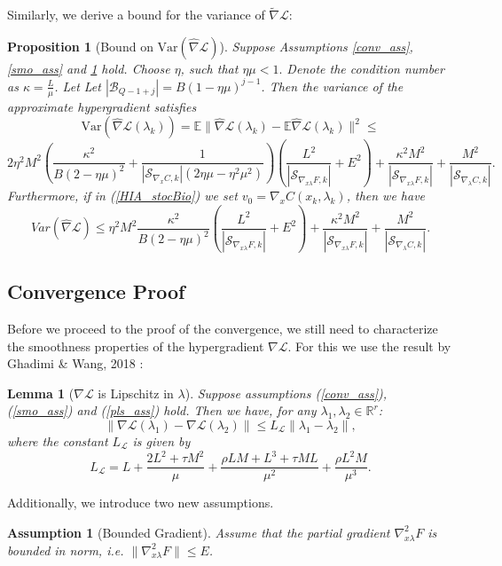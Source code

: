 \documentclass[11pt, twoside]{report}
\newtheorem{proposition}[theorem]{Proposition}
\newtheorem{assumption}[theorem]{Assumption}
\newtheorem{lemma}[theorem]{Lemma}
\begin{document}
Similarly, we derive a bound for the variance of $\widetilde{\nabla} \mathcal{L}$:
\begin{proposition}[Bound on $\mathrm{Var}(\widehat{\nabla} \mathcal{L})$] \label{bound_nabla_hat}
Suppose Assumptions \ref{conv_ass}, \ref{smo_ass} and \ref{nablaFxl_bnd} hold. Choose $\eta$, such that $\eta \mu < 1.$ Denote the condition number as $\kappa = \frac{L}{\mu}$. Let Let $|\mathcal{B}_{Q-1+j}| = B(1-\eta\mu)^{j-1}$. Then the variance of the approximate hypergradient satisfies
\[\mathrm{Var}(\widehat{\nabla} \mathcal{L}(\lambda_k)) = \mathbb{E}\|\widehat{\nabla} \mathcal{L}(\lambda_k) - \mathbb{E}\widehat{\nabla} \mathcal{L}(\lambda_k)\|^2 \leq\]
\[2\eta^2M^2\left(\frac{\kappa^2}{B (2 - \eta \mu)^2} + \frac{1}{|\mathcal{S}_{\nabla_{x} C,k}|(2\eta \mu - \eta^2 \mu^2)} \right)\left(\frac{L^2}{|\mathcal{S}_{\nabla_{x\lambda} F,k}|} + E^2\right)  +  \frac{\kappa^2M^2}{|\mathcal{S}_{\nabla_{x\lambda} F,k}|}+ \frac{M^2}{|\mathcal{S}_{\nabla_{\lambda} C,k}|}.\]
Furthermore, if in (\ref{HIA_stocBio}) we set $v_0 = \nabla_x C(x_k,\lambda_k)$, then we have
    \[Var(\widehat{\nabla} \mathcal{L}) \leq \eta^2M^2\frac{\kappa^2}{B (2 - \eta \mu)^2} \left(\frac{L^2}{|\mathcal{S}_{\nabla_{x\lambda} F,k}|} + E^2\right)  +  \frac{\kappa^2M^2}{|\mathcal{S}_{\nabla_{x\lambda} F,k}|}+ \frac{M^2}{|\mathcal{S}_{\nabla_{\lambda} C,k}|}.\]
\end{proposition}


\subsection{Convergence Proof}
Before we proceed to the proof of the convergence, we still need to characterize the smoothness properties of the hypergradient $\nabla \mathcal{L}.$ For this we use the result by Ghadimi \& Wang, 2018 \cite{ghadimi2018approximation}:
\begin{lemma}[$\nabla \mathcal{L}$ is Lipschitz in $\lambda$] \label{nab_lip}
Suppose assumptions (\ref{conv_ass}), (\ref{smo_ass}) and (\ref{pls_ass}) hold. Then we have, for any $\lambda_1, \lambda_2 \in \mathbb{R}^r$:
\[\|\nabla \mathcal{L}(\lambda_1) - \nabla \mathcal{L}(\lambda_2)\| \leq L_{\mathcal{L}} \|\lambda_1 - \lambda_2\|,\]
where the constant $L_{\mathcal{L}}$ is given by
\[L_{\mathcal{L}} = L + \frac{2L^2 + \tau M^2}{\mu} + \frac{\rho L M + L^3 + \tau M L}{\mu^2} + \frac{\rho L^2 M}{\mu^3}.\]
\end{lemma}
Additionally, we introduce two new assumptions.
\begin{assumption}[Bounded Gradient] \label{nablaFxl_bnd}
    Assume that the partial gradient $\nabla_{x\lambda}^2 F$ is bounded in norm, i.e. $\|\nabla_{x\lambda}^2 F\| \leq E$.
\end{assumption}
\end{document}
